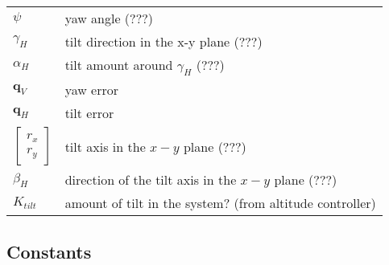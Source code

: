 \documentclass{article}
\numberwithin{equation}{section} %
\newcommand{\bs}[1]{\boldsymbol{#1}}
\begin{document}
\begin{longtable}{p{2cm}p{8cm}}
 	$ \psi $				& yaw angle ($???$) \\
 	$ \gamma_H $			& tilt direction in the x-y plane ($???$) \\
 	$ \alpha_H $			& tilt amount around $\gamma_H$ ($???$) \\
 	$ \bs{q}_V$				& yaw error \\
 	$ \bs{q}_H$				& tilt error \\
 	$ \begin{bmatrix}
 		r_x \\
 		r_y \end{bmatrix}$	& tilt axis in the $x-y$ plane ($???$) \\
 	$ \beta_H $				& direction of the tilt axis in the $x-y$ plane ($???$) \\
	$ K_{tilt} $			& amount of tilt in the system? (from altitude controller) \\
	 	
\end{longtable}

\subsection{Constants}
\end{document}
